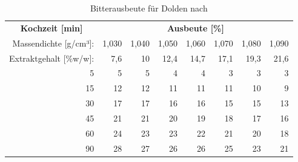 \documentclass[a4paper,parskip=half]{scrartcl}
\begin{document}
\begin{table}[H]
\centering
\begin{tabular}{rrrrrrrr} 
\toprule
\multicolumn{1}{c}{\textbf{Kochzeit [min]}} & \multicolumn{7}{c}{\textbf{Ausbeute [\%]}}  \\
Massendichte [g/cm³]:                                        & 1,030 & 1,040 & 1,050 & 1,060 & 1,070 & 1,080  & 1,090                   \\
Extraktgehalt [\%w/w]:                                            & 7,6 & 10 & 12,4 & 14,7 & 17,1 & 19,3  & 21,6                   \\                                            
\midrule

5                                            & 5     & 5     & 4     & 4     & 3     & 3      & 3                          \\
15                                           & 12    & 12    & 11    & 11    & 11    & 10     & 9                          \\
30                                           & 17    & 17    & 16    & 16    & 15    & 15     & 13                         \\
45                                           & 21    & 21    & 20    & 19    & 18    & 17     & 16                         \\
60                                           & 24    & 23    & 23    & 22    & 21    & 20     & 18                         \\
90                                           & 28    & 27    & 26    & 26    & 25    & 23     & 21                         \\
\bottomrule
\end{tabular}
\caption{Bitterausbeute für Dolden nach \citeauthor{Mosher1994} \parencite[51]{Holle2010}}
\label{table:mosherutil}
\end{table}
\end{document}
